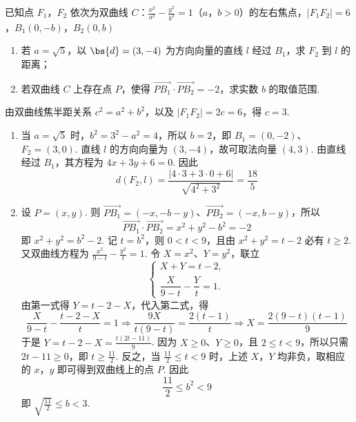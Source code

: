 \begin{problem}
已知点 \(F_{1}\)，\(F_{2}\) 依次为双曲线 \(C\)：\(\frac{x^{2}}{a^{2}}-\frac{y^{2}}{b^{2}}=1\)（\(a\)，\(b>0\)）的左右焦点，\(\left|F_{1}F_{2}\right|=6\)，\(B_{1}(0,-b)\)，\(B_{2}(0,b)\)
\begin{enumerate}
\item 若 \( a=\sqrt{5} \)，以 \( \bs{d}=(3,-4) \) 为方向向量的直线 \(l\) 经过 \(B_{1}\)，求 \(F_{2}\) 到 \(l\) 的距离；
\item 若双曲线 \(C\) 上存在点 \(P\)，使得 \( \overrightarrow{PB_{1}} \cdot \overrightarrow{PB_{2}} = -2 \)，求实数 \(b\) 的取值范围.
\end{enumerate}

\begin{solution}
由双曲线焦半距关系 \(c^2=a^2+b^2\)，以及 \(|F_1F_2|=2c=6\)，得 \(c=3\).

\begin{enumerate}
\item 当 \(a=\sqrt5\) 时，\(b^2=3^2-a^2=4\)，所以 \(b=2\)，即 \(B_1=(0,-2)\)、\(F_2=(3,0)\). 直线 \(l\) 的方向向量为 \((3,-4)\)，故可取法向量 \((4,3)\). 由直线经过 \(B_1\)，其方程为 \(4x+3y+6=0\). 因此
\[
d(F_2,l)=\frac{|4\cdot3+3\cdot0+6|}{\sqrt{4^2+3^2}}=\frac{18}{5}
\]

\item 设 \(P=(x,y)\). 则 \(\overrightarrow{PB_1}=(-x,-b-y)\)、\(\overrightarrow{PB_2}=(-x,b-y)\)，所以
\[
\overrightarrow{PB_1}\cdot\overrightarrow{PB_2}=x^2+y^2-b^2=-2
\]
即 \(x^2+y^2=b^2-2\). 记 \(t=b^2\)，则 \(0<t<9\)，且由 \(x^2+y^2=t-2\) 必有 \(t\geq2\). 又双曲线方程为 \(\frac{x^2}{9-t}-\frac{y^2}{t}=1\). 令 \(X=x^2\)、\(Y=y^2\)，联立
\[
\begin{cases}
X+Y=t-2,\\
\dfrac{X}{9-t}-\dfrac{Y}{t}=1.
\end{cases}
\]
由第一式得 \(Y=t-2-X\)，代入第二式，得
\[
\frac{X}{9-t}-\frac{t-2-X}{t}=1
\Longrightarrow \frac{9X}{t(9-t)}=\frac{2(t-1)}{t}
\Longrightarrow X=\frac{2(9-t)(t-1)}9
\]
于是 \(Y=t-2-X=\frac{t(2t-11)}9\). 因为 \(X\geq0\)、\(Y\geq0\)，且 \(2\leq t<9\)，所以只需 \(2t-11\geq0\)，即 \(t\geq\frac{11}{2}\). 反之，当 \(\frac{11}{2}\leq t<9\) 时，上述 \(X\)，\(Y\) 均非负，取相应的 \(x\)，\(y\) 即可得到双曲线上的点 \(P\). 因此
\[
\frac{11}{2}\leq b^2<9
\]
即 \(\sqrt{\frac{11}{2}}\leq b<3\).
\end{enumerate}
\end{solution}
\end{problem}

